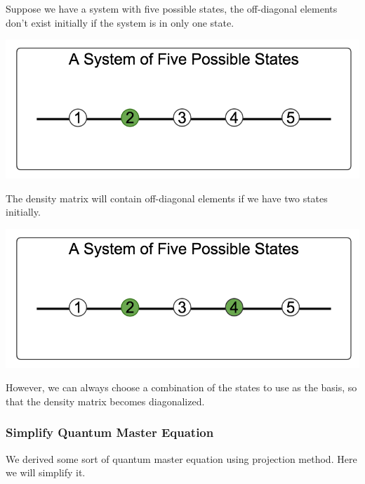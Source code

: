\documentclass[letterpaper,10pt,english]{sphinxmanual}
\begin{document}
Suppose we have a system with five possible states, the off-diagonal elements don't exist initially if the system is in only one state.

{\hfill\includegraphics{quantum1state.png}\hfill}

The density matrix will contain off-diagonal elements if we have two states initially.

{\hfill\includegraphics{quantum2states.png}\hfill}

However, we can always choose a combination of the states to use as the basis, so that the density matrix becomes diagonalized.


\subsubsection{Simplify Quantum Master Equation}
\label{nonequilibrium/quantumMasterEqn:simplify-quantum-master-equation}
We derived some sort of quantum master equation using projection method. Here we will simplify it.
\end{document}
